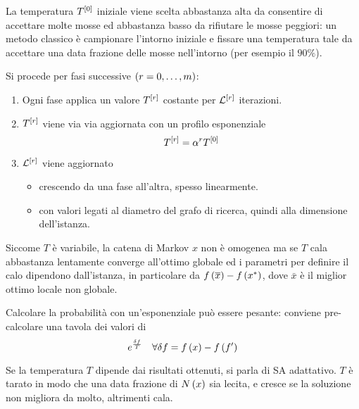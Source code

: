 \documentclass[\main/main.tex]{subfiles}
\begin{document}
\begin{multicols}{2}
\begin{analysis}
La temperatura \(T^{\left[0\right]}\) iniziale viene scelta abbastanza alta da consentire di accettare molte mosse ed abbastanza basso da rifiutare le mosse peggiori: un metodo classico è campionare l'intorno iniziale e fissare una temperatura tale da accettare una data frazione delle mosse nell'intorno (per esempio il \(90\%\)).
\end{analysis}
\begin{observation}
Si procede per fasi successive \(\left(r=0, \ldots, m\right)\):
\begin{enumerate}
    \item Ogni fase applica un valore \(T^{\left[r\right]}\) costante per \(\mathcal{L}^{\left[r\right]}\) iterazioni.
    \item \(T^{\left[r\right]}\) viene via via aggiornata con un profilo esponenziale
    \[
        T^{\left[r\right]} = \alpha^r T^{\left[0\right]}
    \]
    \item \(\mathcal{L}^{\left[r\right]}\) viene aggiornato
    \begin{itemize}
        \item crescendo da una fase all'altra, spesso linearmente.
        \item con valori legati al diametro del grafo di ricerca, quindi alla dimensione dell'istanza.
    \end{itemize}
\end{enumerate}
Siccome \(T\) è variabile, la catena di Markov \(x\) non è omogenea ma se \(T\) cala abbastanza lentamente converge all'ottimo globale ed i parametri per definire il calo dipendono dall'istanza, in particolare da \(f\left(\overline{x}\right) - f\left(x^*\right)\), dove \(\bar{x}\) è il miglior ottimo locale non globale.
\end{observation}
\begin{observation}
    Calcolare la probabilità con un'esponenziale può essere pesante: conviene pre-calcolare una tavola dei valori di 
    \[
    e^\frac{\delta f}{T} \quad \forall \delta f = f\left(x\right) - f\left(f'\right)
    \]
\end{observation}
\begin{observation}
    Se la temperatura \(T\) dipende dai risultati ottenuti, si parla di SA adattativo. \(T\) è tarato in modo che una data frazione di \(N\left(x\right)\) sia lecita, e cresce se la soluzione non migliora da molto, altrimenti cala.
\end{observation}
\end{multicols}
\end{document}

